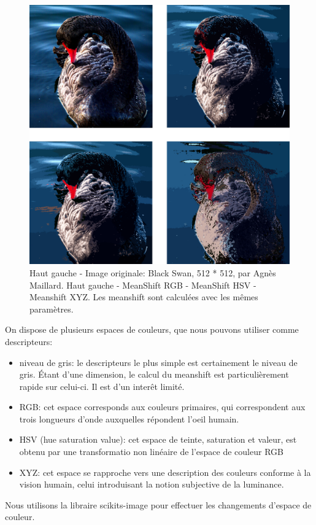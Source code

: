 \documentclass{article}
\begin{document}
\begin{figure}
\includegraphics[width=450px]{images/color_black_swan.png}
\caption{Haut gauche - Image originale: Black Swan, 512 * 512, par Agnès
Maillard. Haut gauche - MeanShift RGB - MeanShift HSV - Meanshift XYZ. Les
meanshift sont calculées avec les mêmes paramètres.}
\end{figure}

On dispose de plusieurs espaces de couleurs, que nous pouvons utiliser comme
descripteurs:

\begin{itemize}
\item niveau de gris: le descripteurs le plus simple est certainement le
niveau de gris. Étant d'une dimension, le calcul du meanshift est
particulièrement rapide sur celui-ci. Il est d'un interêt limité.
\item RGB: cet espace corresponds aux couleurs primaires, qui correspondent
aux trois longueurs d'onde auxquelles répondent l'oeil humain.
\item HSV (hue saturation value): cet espace de teinte, saturation et valeur,
est obtenu par une transformatio non linéaire de l'espace de couleur RGB
\item XYZ: cet espace se rapproche vers une description des couleurs conforme
à la vision humain, celui introduisant la notion subjective de la luminance.
\end{itemize}

Nous utilisons la libraire scikits-image pour effectuer les changements
d'espace de couleur.
\end{document}
